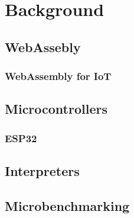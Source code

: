 
\chapter{Background}\label{chapter:background}

\section{WebAssebly}

\subsection{WebAssembly for IoT}

\section{Microcontrollers}

\subsection{ESP32}

\section{Interpreters}

\section{Microbenchmarking}
